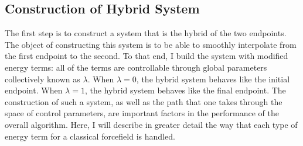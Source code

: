 \subsection{Construction of Hybrid System}
%
The first step is to construct a system that is the hybrid of the two endpoints.
%
The object of constructing this system is to be able to smoothly interpolate from the first endpoint to the second.
%
To that end, I build the system with modified energy terms: all of the terms are controllable through global parameters collectively known as $\lambda$.
%
When $\lambda=0$, the hybrid system behaves like the initial endpoint.
%
When $\lambda=1$, the hybrid system behaves like the final endpoint.
%
The construction of such a system, as well as the path that one takes through the space of control parameters, are important factors in the performance of the overall algorithm.
%
Here, I will describe in greater detail the way that each type of energy term for a classical forcefield is handled.
%
